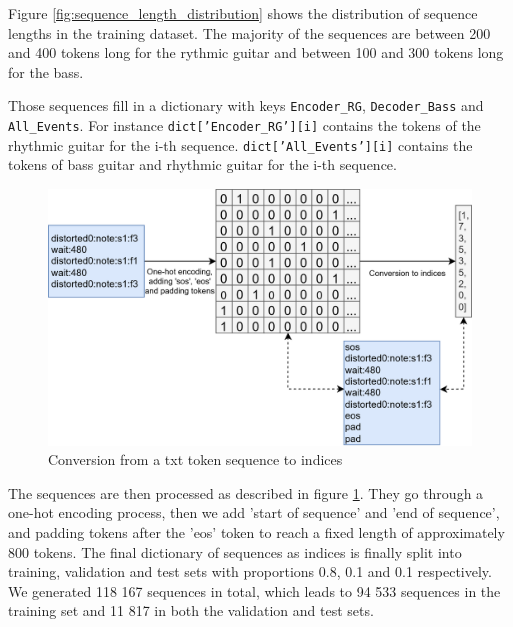 Figure \ref{fig:sequence_length_distribution} shows the distribution of sequence lengths in the training dataset.
The majority of the sequences are between 200 and 400 tokens long for the rythmic guitar and between 100 and 300 tokens long for the bass.

Those sequences fill in a dictionary with keys \texttt{Encoder\_RG}, \texttt{Decoder\_Bass} and \texttt{All\_Events}.
For instance \texttt{dict['Encoder\_RG'][i]} contains the tokens of the rhythmic guitar for the i-th sequence.
\texttt{dict['All\_Events'][i]} contains the tokens of bass guitar and rhythmic guitar for the i-th sequence.


\begin{figure}[!ht]
    \centering
    \includegraphics[width=.8\linewidth]{../images-figures/conversion_indices.png}
    \caption{Conversion from a txt token sequence to indices}
    \label{fig:conversion_indices}
\end{figure}

The sequences are then processed as described in figure \ref{fig:conversion_indices}.
They go through a one-hot encoding process, then we add 'start of sequence' and 'end of sequence',
and padding tokens after the 'eos' token to reach a fixed length of approximately 800 tokens.
The final dictionary of sequences as indices is finally split into training, validation and test sets with proportions 0.8, 0.1 and 0.1 respectively.
We generated 118 167 sequences in total, which leads to 94 533 sequences in the training set and 11 817 in both the validation and test sets.

